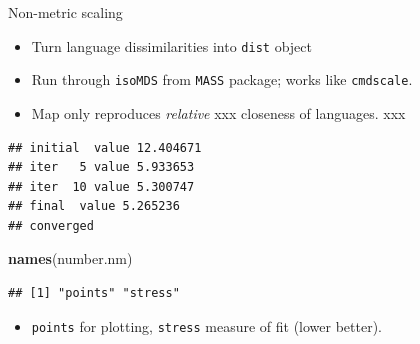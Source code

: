 \documentclass[ignorenonframetext,]{beamer}
\newenvironment{Shaded}{\begin{snugshade}}{\end{snugshade}}
\newcommand{\KeywordTok}[1]{\textcolor[rgb]{0.13,0.29,0.53}{\textbf{#1}}}
\newcommand{\NormalTok}[1]{#1}
\newcommand{\OperatorTok}[1]{\textcolor[rgb]{0.81,0.36,0.00}{\textbf{#1}}}
\newcommand{\StringTok}[1]{\textcolor[rgb]{0.31,0.60,0.02}{#1}}
\providecommand{\tightlist}{%
  \setlength{\itemsep}{0pt}\setlength{\parskip}{0pt}}
\begin{document}
\begin{frame}[fragile]{Non-metric scaling}
\protect\hypertarget{non-metric-scaling-1}{}

\begin{itemize}
\item
  Turn language dissimilarities into \texttt{dist} object
\item
  Run through \texttt{isoMDS} from \texttt{MASS} package; works like
  \texttt{cmdscale}.
\item
  Map only reproduces \emph{relative} xxx closeness of languages. xxx
\end{itemize}

\small

\begin{Shaded}
\end{Shaded}

\begin{verbatim}
## initial  value 12.404671 
## iter   5 value 5.933653
## iter  10 value 5.300747
## final  value 5.265236 
## converged
\end{verbatim}

\begin{Shaded}
\begin{Highlighting}[]
\KeywordTok{names}\NormalTok{(number.nm)}
\end{Highlighting}
\end{Shaded}

\begin{verbatim}
## [1] "points" "stress"
\end{verbatim}

\normalsize

\begin{itemize}
\tightlist
\item
  \texttt{points} for plotting, \texttt{stress} measure of fit (lower
  better).
\end{itemize}

\end{frame}
\end{document}
